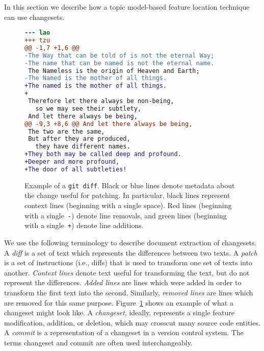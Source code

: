 
In this section we describe how a topic model-based feature location
technique can use changesets.

\begin{figure}[t]
\centering
\footnotesize
\begin{lstlisting}[language=diff, basicstyle=\ttfamily]
--- lao
+++ tzu
@@ -1,7 +1,6 @@
-The Way that can be told of is not the eternal Way;
-The name that can be named is not the eternal name.
 The Nameless is the origin of Heaven and Earth;
-The Named is the mother of all things.
+The named is the mother of all things.
+
 Therefore let there always be non-being,
   so we may see their subtlety,
 And let there always be being,
@@ -9,3 +8,6 @@ And let there always be being,
 The two are the same,
 But after they are produced,
   they have different names.
+They both may be called deep and profound.
+Deeper and more profound,
+The door of all subtleties!
\end{lstlisting}
\caption{Example of a \texttt{git diff}.
Black or blue lines denote metadata about the change useful for patching.
In particular, black lines represent context lines (beginning with a single space).
Red lines (beginning with a single~\texttt{-}) denote line removals,
and green lines (beginning with a single~\texttt{+}) denote line additions.}
\label{fig:diff}
\vspace{-10pt}
\end{figure}


We use the following terminology to describe document extraction of changesets.
A \textit{diff} is a set of text which represents the differences between two texts.
A \textit{patch} is a set of instructions (i.e., diffs) that is used to transform one set of texts into another.
\textit{Context lines} denote text useful for transforming the text, but do not represent the differences.
\textit{Added lines} are lines which were added in order to transform the first text into the second.
Similarly, \textit{removed lines} are lines which are removed for this same purpose.
Figure~\ref{fig:diff} shows an example of what a changeset might look like.
A \textit{changeset}, ideally, represents a single feature modification,
addition, or deletion, which may crosscut many source code entities.
A \textit{commit} is a representation of a changeset in a version control system.
The terms changeset and commit are often used interchangeably.

